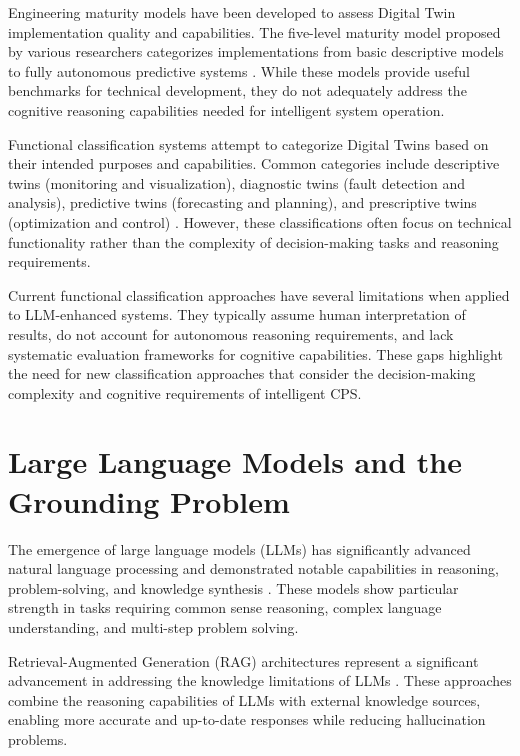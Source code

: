 Engineering maturity models have been developed to assess Digital Twin implementation quality and capabilities. The five-level maturity model proposed by various researchers categorizes implementations from basic descriptive models to fully autonomous predictive systems \cite{rasheed2020digital, tao2019digital}. While these models provide useful benchmarks for technical development, they do not adequately address the cognitive reasoning capabilities needed for intelligent system operation.

Functional classification systems attempt to categorize Digital Twins based on their intended purposes and capabilities. Common categories include descriptive twins (monitoring and visualization), diagnostic twins (fault detection and analysis), predictive twins (forecasting and planning), and prescriptive twins (optimization and control) \cite{kritzinger2018digital, negri2017review}. However, these classifications often focus on technical functionality rather than the complexity of decision-making tasks and reasoning requirements.

Current functional classification approaches have several limitations when applied to LLM-enhanced systems. They typically assume human interpretation of results, do not account for autonomous reasoning requirements, and lack systematic evaluation frameworks for cognitive capabilities. These gaps highlight the need for new classification approaches that consider the decision-making complexity and cognitive requirements of intelligent CPS.

\section{Large Language Models and the Grounding Problem}

The emergence of large language models (LLMs) has significantly advanced natural language processing and demonstrated notable capabilities in reasoning, problem-solving, and knowledge synthesis \cite{brown2020language, chowdhery2022palm, openai2023gpt4}. These models show particular strength in tasks requiring common sense reasoning, complex language understanding, and multi-step problem solving.

Retrieval-Augmented Generation (RAG) architectures represent a significant advancement in addressing the knowledge limitations of LLMs \cite{lewis2020retrieval, karpukhin2020dense}. These approaches combine the reasoning capabilities of LLMs with external knowledge sources, enabling more accurate and up-to-date responses while reducing hallucination problems.

